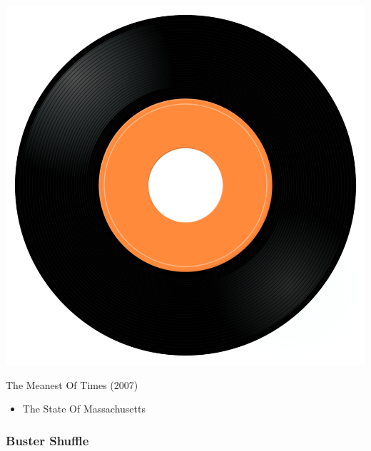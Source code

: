 \begin{minipage}[t]{0.25\textwidth}\vspace{0pt}
\captionsetup{type=figure}
\includegraphics[width=\textwidth]{Images/cover.png}
\caption*{The Meanest Of Times (2007)}
\end{minipage}
\begin{minipage}[t]{0.25\textwidth}\vspace{0pt}
\begin{itemize}[nosep,leftmargin=1em,labelwidth=*,align=left]
	\setlength{\itemsep}{0pt}
	\item The State Of Massachusetts
\end{itemize}
\end{minipage}

\subsubsection{Buster Shuffle}

